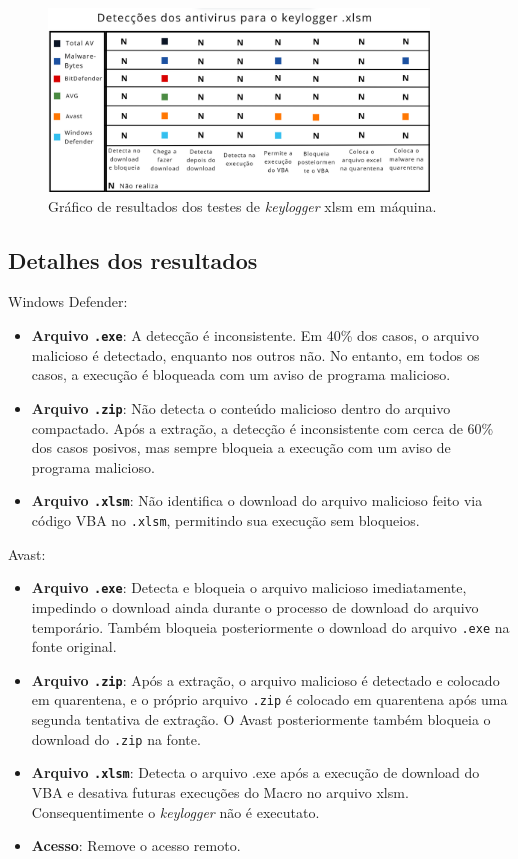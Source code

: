 \documentclass[12pt]{article}
\begin{document}
\begin{figure}[H]
    \centering
    \includegraphics[width=0.9\textwidth]{imgs/xlsmtabelaresultado.png} 
    \caption{Gráfico de resultados dos testes de \textit{keylogger} xlsm em máquina.}
\end{figure}



\subsection*{Detalhes dos resultados}
Windows Defender:
\begin{itemize}
    \item \textbf{Arquivo \texttt{.exe}}: A detecção é inconsistente. Em 40\% dos casos, o arquivo malicioso é detectado, enquanto nos outros não. No entanto, em todos os casos, a execução é bloqueada com um aviso de programa malicioso.
    \item \textbf{Arquivo \texttt{.zip}}: Não detecta o conteúdo malicioso dentro do arquivo compactado. Após a extração, a detecção é inconsistente com cerca de 60\% dos casos posivos, mas sempre bloqueia a execução com um aviso de programa malicioso.
    \item \textbf{Arquivo \texttt{.xlsm}}: Não identifica o download do arquivo malicioso feito via código VBA no \texttt{.xlsm}, permitindo sua execução sem bloqueios.
\end{itemize}

\noindent Avast:
\begin{itemize}
    \item \textbf{Arquivo \texttt{.exe}}: Detecta e bloqueia o arquivo malicioso imediatamente, impedindo o download ainda durante o processo de download do arquivo temporário. Também bloqueia posteriormente o download do arquivo \texttt{.exe} na fonte original.
    \item \textbf{Arquivo \texttt{.zip}}: Após a extração, o arquivo malicioso é detectado e colocado em quarentena, e o próprio arquivo \texttt{.zip} é colocado em quarentena após uma segunda tentativa de extração. O Avast posteriormente também bloqueia o download do \texttt{.zip} na fonte.
    \item \textbf{Arquivo \texttt{.xlsm}}:  Detecta o arquivo .exe após a execução de download do VBA e desativa futuras execuções do Macro no arquivo xlsm. Consequentimente o \textit{keylogger} não é executato.
    \item \textbf{Acesso}: Remove o acesso remoto.
\end{itemize}
\end{document}
